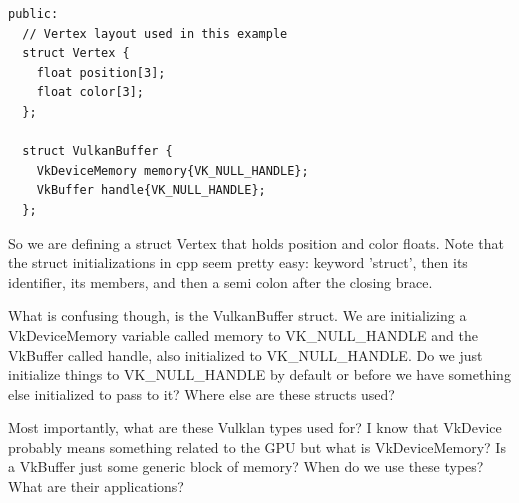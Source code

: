 \documentclass{article}
\begin{document}
\begin{verbatim}
public:
  // Vertex layout used in this example
  struct Vertex {
    float position[3];
    float color[3];
  };

  struct VulkanBuffer {
    VkDeviceMemory memory{VK_NULL_HANDLE};
    VkBuffer handle{VK_NULL_HANDLE};
  };
\end{verbatim}
\begin{tcolorbox}[
  enhanced,
  breakable,
  colback=orange!5,
  colframe=orange!75!black,
  sharp corners=all,
  boxrule=0.8pt,
  left=5pt,
  right=5pt,
  top=6pt,
  bottom=6pt
]
\par So we are defining a struct Vertex that holds position and color
floats. Note that the struct initializations in cpp seem pretty easy:
keyword 'struct', then its identifier, its members, and then a semi
colon after the closing brace.

\par What is confusing though, is the VulkanBuffer struct. We are
initializing a VkDeviceMemory variable called memory to
VK\_NULL\_HANDLE and the VkBuffer called handle, also initialized to
VK\_NULL\_HANDLE. Do we just initialize things to VK\_NULL\_HANDLE by
default or before we have something else initialized to pass to it?
Where else are these structs used?

\par Most importantly, what are these Vulklan types used for? I know
that VkDevice probably means something related to the GPU\textemdash
but what is VkDeviceMemory? Is a VkBuffer just some generic block of
memory? When do we use these types? What are their applications?
\end{tcolorbox}
\end{document}
